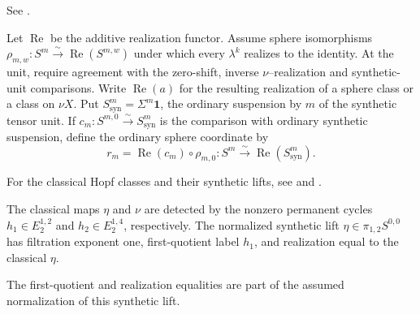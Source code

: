 \begin{definition}
\label{sem:Literature:realization-coordinates}
See \cite[Proposition 4.40]{Pst}.\par

Let $\operatorname{Re}$ be the additive realization functor. Assume sphere
isomorphisms
$\rho_{m,w}:S^m\xrightarrow{\sim}\operatorname{Re}(S^{m,w})$
under which every $\lambda^k$ realizes to the identity. At the unit,
require agreement with the zero-shift, inverse
$\nu$--realization and synthetic-unit comparisons. Write
$\operatorname{Re}(a)$ for the resulting realization of a sphere class
or a class on $\nu X$. Put $S^m_{\mathrm{syn}}=\Sigma^m\mathbf1$,
the ordinary suspension by $m$ of the synthetic tensor unit. If
$c_m:S^{m,0}\xrightarrow{\sim}S^m_{\mathrm{syn}}$
is the comparison with ordinary synthetic suspension, define
the ordinary sphere coordinate by
\[
r_m=\operatorname{Re}(c_m)\circ\rho_{m,0}:
S^m\xrightarrow{\sim}\operatorname{Re}(S^m_{\mathrm{syn}}).
\]

\end{definition}


\begin{proposition}
\label{sem:Literature:hopf-classes}
For the classical Hopf classes and their synthetic lifts, see
\cite[Lemma 2.3]{Adams58} and \cite[Proposition 3.16]{LWX126}.\par

The classical maps $\eta$ and $\nu$ are detected by the nonzero permanent cycles $h_1\in E_2^{1,2}$ and $h_2\in E_2^{1,4}$, respectively. The normalized synthetic lift $\eta\in\pi_{1,2}S^{0,0}$ has filtration exponent one, first-quotient label $h_1$, and realization equal to the classical $\eta$.

The first-quotient and realization equalities are part of the assumed
normalization of this synthetic lift.

\end{proposition}

